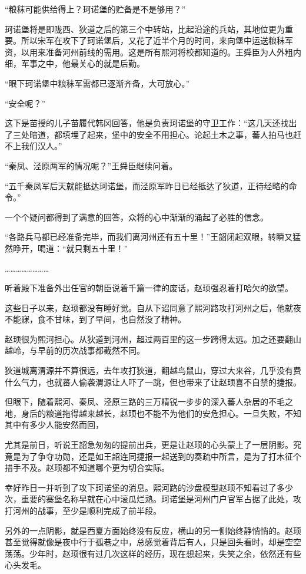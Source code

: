 “粮秣可能供给得上？珂诺堡的贮备是不是够用？”

珂诺堡将是即陇西、狄道之后的第三个中转站，比起沿途的兵站，其地位更为重要。所以宋军在攻下了珂诺堡后，又花了近半个月的时间，来向堡中运送粮秣军资，以用来准备河州前线的需用。这是所有熙河将校都知道的。王舜臣为人外粗内细，军事之中，他最关心的就是后勤。

“眼下珂诺堡中粮秣军需都已逐渐齐备，大可放心。”

“安全呢？”

这下是苗授的儿子苗履代韩冈回答，他是负责珂诺堡的守卫工作：“这几天还找出了三处暗道，都填埋了起来，堡中的安全不用担心。论起土木之事，蕃人拍马也赶不上我们汉人。”

“秦凤、泾原两军的情况呢？”王舜臣继续问着。

“五千秦凤军后天就能抵达珂诺堡，而泾原军昨日已经抵达了狄道，正待经略的命令。”

一个个疑问都得到了满意的回答，众将的心中渐渐的涌起了必胜的信念。

“各路兵马都已经准备完毕，而我们离河州还有五十里！”王韶闭起双眼，转瞬又猛然睁开，喝道：“就只剩五十里！”

……………………

听着殿下准备外出任官的朝臣说着千篇一律的废话，赵顼强忍着打哈欠的欲望。

这些日子以来，赵顼都没有睡好觉。自从下诏同意了熙河路攻打河州之后，他就夜不能寐，食不甘味，到了早间，也自然没了精神。

赵顼很为熙河担心。从狄道到河州，超过两百里的这一步跨得太远。加之还要翻山越岭，与早前的历次战事都截然不同。

狄道城离渭源并不算很远，去年攻打狄道，翻越鸟鼠山，穿过大来谷，几乎没有费什么气力，也就蕃人偷袭渭源让人吓了一跳，但也带来了让赵顼喜不自禁的捷报。

但眼下，随着熙河、秦凤、泾原三路的三万精锐一步步的深入蕃人杂居的不毛之地，身后的粮道拖得越来越长，赵顼也不能不为他们的安危担心。一旦失败，不知其中有多少人能安然而回，

尤其是前日，听说王韶急匆匆的提前出兵，更是让赵顼的心头蒙上了一层阴影。究竟是为了争夺功勋，还是如王韶连同捷报一起送到的奏疏中所言，是为了打木征个措手不及。赵顼都不知道哪个更为切合实际。

幸好昨日一并听到了攻下珂诺堡的消息。熙河路的沙盘模型赵顼不知看过了多少次，重要的寨堡名称早就在心中滚瓜烂熟。珂诺堡是河州门户官军占据了此处，攻打河州的战事，至少是顺利完成了前半段。

另外的一点阴影，就是西夏方面始终没有反应，横山的另一侧始终静悄悄的。赵顼甚至觉得就像是夜中行于孤巷之中，总感觉着背后有人，只是回头看时，却是空空荡荡。少年时，赵顼很有过几次这样的经历，现在想起来，失笑之余，依然还有些心头发毛。

